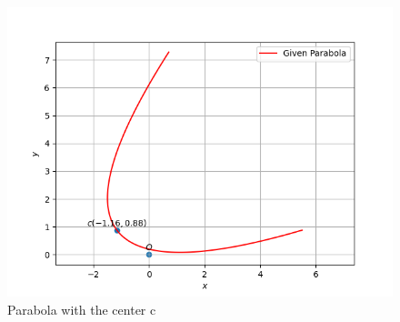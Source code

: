 \begin{enumerate}
\begin{figure}[!ht]
    \centering
    \includegraphics[width=\columnwidth]{./figs/parab/parab_gen.png}
    \caption{Parabola with the center c}
    \label{eq:conics/ex/solution/Fig:1}
\end{figure}
\end{enumerate}
